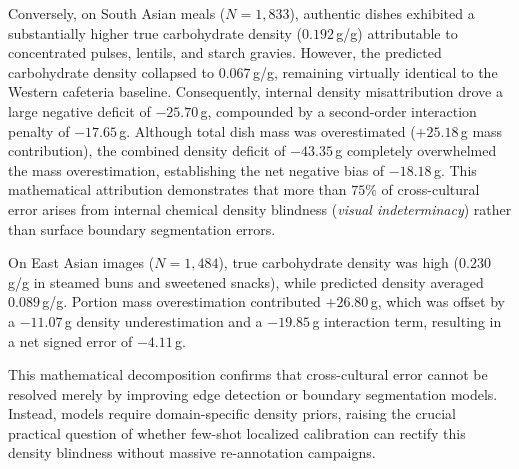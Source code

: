 \documentclass[utf8]{FrontiersinVancouver}
\begin{document}
Conversely, on South Asian meals ($N=1,833$), authentic dishes exhibited a substantially higher true carbohydrate density ($0.192$\,g/g) attributable to concentrated pulses, lentils, and starch gravies. However, the predicted carbohydrate density collapsed to $0.067$\,g/g, remaining virtually identical to the Western cafeteria baseline. Consequently, internal density misattribution drove a large negative deficit of $-25.70$\,g, compounded by a second-order interaction penalty of $-17.65$\,g. Although total dish mass was overestimated ($+25.18$\,g mass contribution), the combined density deficit of $-43.35$\,g completely overwhelmed the mass overestimation, establishing the net negative bias of $-18.18$\,g. This mathematical attribution demonstrates that more than $75\%$ of cross-cultural error arises from internal chemical density blindness (\emph{visual indeterminacy}) rather than surface boundary segmentation errors.

On East Asian images ($N=1,484$), true carbohydrate density was high ($0.230$\,g/g in steamed buns and sweetened snacks), while predicted density averaged $0.089$\,g/g. Portion mass overestimation contributed $+26.80$\,g, which was offset by a $-11.07$\,g density underestimation and a $-19.85$\,g interaction term, resulting in a net signed error of $-4.11$\,g.

This mathematical decomposition confirms that cross-cultural error cannot be resolved merely by improving edge detection or boundary segmentation models. Instead, models require domain-specific density priors, raising the crucial practical question of whether few-shot localized calibration can rectify this density blindness without massive re-annotation campaigns.

\begin{table}[tbp]
\centering
\small
\caption{\textbf{Mathematical Error Decomposition for Dietary Carbohydrate Estimation.} Attribution of total carbohydrate estimation error into portion mass deviation, nutrient density misattribution, and second-order interaction across cohorts ($N=3,823$ total images). Best values per column are highlighted in bold.}
\label{tab:error_decomposition}
\vspace{4pt}
\end{table}
\end{document}
